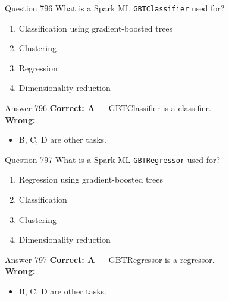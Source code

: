 \documentclass[aspectratio=169,11pt]{beamer}
\begin{document}
	\begin{frame}{Question 796}
		What is a Spark ML \texttt{GBTClassifier} used for?
		\begin{enumerate}[label=\Alph*.]
			\item Classification using gradient-boosted trees
			\item Clustering
			\item Regression
			\item Dimensionality reduction
		\end{enumerate}
	\end{frame}
	\begin{frame}{Answer 796}
		\textbf{Correct: A} --- GBTClassifier is a classifier.\\
		\vspace{0.5em}
		\textbf{Wrong:}
		\begin{itemize}
			\item B, C, D are other tasks.
		\end{itemize}
	\end{frame}
	
	\begin{frame}{Question 797}
		What is a Spark ML \texttt{GBTRegressor} used for?
		\begin{enumerate}[label=\Alph*.]
			\item Regression using gradient-boosted trees
			\item Classification
			\item Clustering
			\item Dimensionality reduction
		\end{enumerate}
	\end{frame}
	\begin{frame}{Answer 797}
		\textbf{Correct: A} --- GBTRegressor is a regressor.\\
		\vspace{0.5em}
		\textbf{Wrong:}
		\begin{itemize}
			\item B, C, D are other tasks.
		\end{itemize}
	\end{frame}
	
\end{document}
